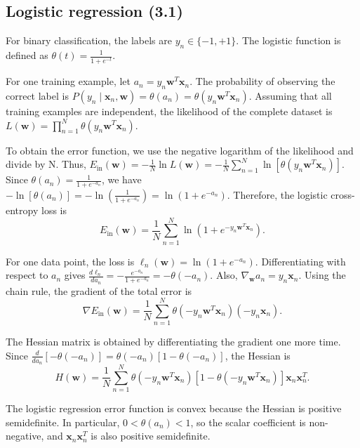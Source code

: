 \documentclass[conference]{IEEEtran}
\begin{document}
\subsection{Logistic regression (3.1)}

For binary classification, the labels are
\(
y_n\in\{-1,+1\}
\).
The logistic function is defined as
\(
\theta(t)=\frac{1}{1+e^{-t}}
\).

For one training example, let
\(
a_n=y_n\mathbf{w}^{T}\mathbf{x}_n
\).
The probability of observing the correct label is
\(
P(y_n\mid\mathbf{x}_n,\mathbf{w})
=
\theta(a_n)
=
\theta(y_n\mathbf{w}^{T}\mathbf{x}_n)
\).
Assuming that all training examples are independent, the likelihood of the complete dataset is
\(
L(\mathbf{w})
=
\prod_{n=1}^{N}
\theta(y_n\mathbf{w}^{T}\mathbf{x}_n)
\).

To obtain the error function, we use the negative logarithm of the likelihood and divide by N. Thus,
\(
E_{\mathrm{in}}(\mathbf{w})
=
-\frac{1}{N}\ln L(\mathbf{w})
=
-\frac{1}{N}
\sum_{n=1}^{N}
\ln\left[
\theta(y_n\mathbf{w}^{T}\mathbf{x}_n)
\right]
\).
Since
\(
\theta(a_n)=\frac{1}{1+e^{-a_n}}
\),
we have
\(
-\ln[\theta(a_n)]
=
-\ln\left(\frac{1}{1+e^{-a_n}}\right)
=
\ln(1+e^{-a_n})
\).
Therefore, the logistic cross-entropy loss is
\[
E_{\mathrm{in}}(\mathbf{w})
=
\frac{1}{N}
\sum_{n=1}^{N}
\ln\left(
1+e^{-y_n\mathbf{w}^{T}\mathbf{x}_n}
\right).
\]

For one data point, the loss is
\(
\ell_n(\mathbf{w})=\ln(1+e^{-a_n})
\).
Differentiating with respect to $a_n$ gives
\(
\frac{d\ell_n}{da_n}
=
-\frac{e^{-a_n}}{1+e^{-a_n}}
=
-\theta(-a_n)
\).
Also,
\(
\nabla_{\mathbf{w}}a_n=y_n\mathbf{x}_n
\).
Using the chain rule, the gradient of the total error is
\[
\nabla E_{\mathrm{in}}(\mathbf{w})
=
\frac{1}{N}
\sum_{n=1}^{N}
\theta(-y_n\mathbf{w}^{T}\mathbf{x}_n)
(-y_n\mathbf{x}_n).
\]

The Hessian matrix is obtained by differentiating the gradient one more time. Since
\(
\frac{d}{da_n}[-\theta(-a_n)]
=
\theta(-a_n)[1-\theta(-a_n)]
\),
the Hessian is
\[
H(\mathbf{w})
=
\frac{1}{N}
\sum_{n=1}^{N}
\theta(-y_n\mathbf{w}^{T}\mathbf{x}_n)
\left[
1-\theta(-y_n\mathbf{w}^{T}\mathbf{x}_n)
\right]
\mathbf{x}_n\mathbf{x}_n^{T}.
\]

The logistic regression error function is convex because the Hessian is positive semidefinite. In particular,
\(
0<\theta(a_n)<1
\),
so the scalar coefficient is non-negative, and
\(
\mathbf{x}_n\mathbf{x}_n^{T}
\)
is also positive semidefinite.
\end{document}
